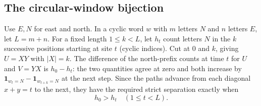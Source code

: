 \documentclass[11pt,a4paper]{article}
\numberwithin{equation}{section}
\theoremstyle{definition}
\theoremstyle{remark}
\begin{document}
\subsection*{The circular-window bijection}
Use $E,N$ for east and north. In a cyclic word $w$ with $m$
letters $N$ and $n$ letters $E$, let $L=m+n$. For a fixed length
$1\le k<L$, let $h_t$ count letters $N$ in the $k$ successive
positions starting at site $t$ (cyclic indices).
Cut at $0$ and $k$, giving $U=XY$ with $|X|=k$. The difference of
the north-prefix counts at time $t$ for $U$ and $V=YX$ is $h_0-h_t$:
the two quantities agree at zero and both increase by
$\mathbf1_{w_t=N}-\mathbf1_{w_{t+k}=N}$ at the next step. Since the
paths advance from each diagonal $x+y=t$ to the next, they have
the required strict separation exactly when
\[
 h_0>h_t\quad(1\le t<L). \tag{1}
\]
\end{document}
